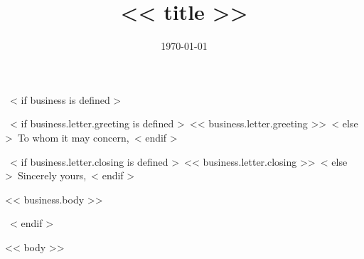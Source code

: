 \documentclass[<< theme.font_size >>, << theme.paper_size >>]{moderncv}
\title{<< title >>}
\begin{document}
~< if business is defined >~
\date{\today}
\opening{~< if business.letter.greeting is defined >~<< business.letter.greeting >>~< else >~To whom it may concern,~< endif >~}
\closing{~< if business.letter.closing is defined >~<< business.letter.closing >>~< else >~Sincerely yours,~< endif >~}

\makelettertitle            %
<< business.body >>

\makeletterclosing          %
\newpage
\setcounter{page}{1}
~< endif >~


\makecvtitle
\vspace{-20pt}

<< body >>
\end{document}
